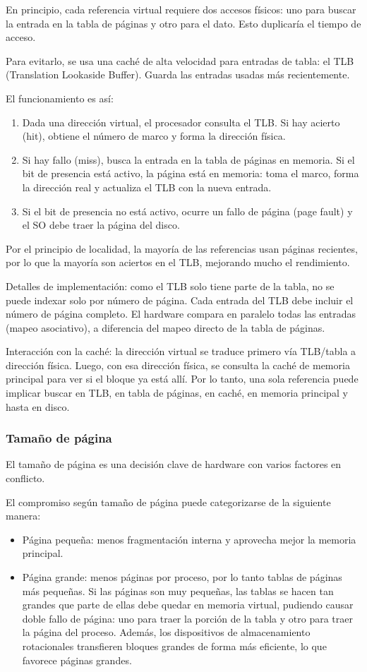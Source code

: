 En principio, cada referencia virtual requiere dos accesos físicos: uno para buscar la entrada en la tabla de páginas y otro para el dato. Esto duplicaría el tiempo de acceso.

Para evitarlo, se usa una caché de alta velocidad para entradas de tabla: el TLB (Translation Lookaside Buffer). Guarda las entradas usadas más recientemente.

El funcionamiento es así:
\begin{enumerate}
  \item Dada una dirección virtual, el procesador consulta el TLB. Si hay acierto (hit), obtiene el número de marco y forma la dirección física.
  \item Si hay fallo (miss), busca la entrada en la tabla de páginas en memoria. Si el bit de presencia está activo, la página está en memoria: toma el marco, forma la dirección real y actualiza el TLB con la nueva entrada.
  \item Si el bit de presencia no está activo, ocurre un fallo de página (page fault) y el SO debe traer la página del disco.
\end{enumerate}

Por el principio de localidad, la mayoría de las referencias usan páginas recientes, por lo que la mayoría son aciertos en el TLB, mejorando mucho el rendimiento.

Detalles de implementación: como el TLB solo tiene parte de la tabla, no se puede indexar solo por número de página. Cada entrada del TLB debe incluir el número de página completo. El hardware compara en paralelo todas las entradas (mapeo asociativo), a diferencia del mapeo directo de la tabla de páginas.

Interacción con la caché: la dirección virtual se traduce primero vía TLB/tabla a dirección física. Luego, con esa dirección física, se consulta la caché de memoria principal para ver si el bloque ya está allí. Por lo tanto, una sola referencia puede implicar buscar en TLB, en tabla de páginas, en caché, en memoria principal y hasta en disco.

\subsubsection{Tamaño de página}

El tamaño de página es una decisión clave de hardware con varios factores en conflicto.

El compromiso según tamaño de página puede categorizarse de la siguiente manera:
\begin{itemize}
  \item Página pequeña: menos fragmentación interna y aprovecha mejor la memoria principal.
  \item Página grande: menos páginas por proceso, por lo tanto tablas de páginas más pequeñas. Si las páginas son muy pequeñas, las tablas se hacen tan grandes que parte de ellas debe quedar en memoria virtual, pudiendo causar doble fallo de página: uno para traer la porción de la tabla y otro para traer la página del proceso. Además, los dispositivos de almacenamiento rotacionales transfieren bloques grandes de forma más eficiente, lo que favorece páginas grandes.
\end{itemize}

